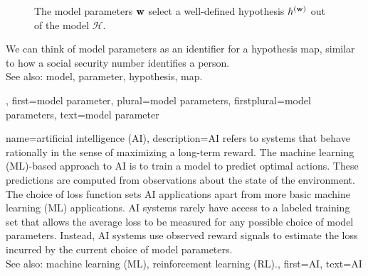 {{{\begin{figure}
		\caption{The model parameters ${\bf w}$ select a well-defined 
		hypothesis $h^{({\bf w})}$ out of the model $\mathcal{H}$.}
	\end{figure}
    We can think of model parameters as an identifier for 
	a hypothesis map, similar to how a social security number 
	identifies a person.\\
		See also: model, parameter, hypothesis, map.},
	first={model parameter},
	plural={model parameters},
	firstplural={model parameters},
	text={model parameter} 
}

{name={artificial intelligence (AI)}, 
	description={AI refers to systems that behave rationally in the sense of 
		maximizing a long-term reward. The machine learning (ML)-based approach to AI is to train a model to  
		predict optimal actions. These predictions are computed from observations about the state of the 
		environment. The choice of loss function sets AI applications apart from more basic machine learning (ML) applications. 
		AI systems rarely have access to a labeled training set that allows the average loss to be 
		measured for any possible choice of model parameters. Instead, AI systems use observed reward 
		signals to estimate the loss incurred by the current choice of model parameters.
				\\
		See also: machine learning (ML), reinforcement learning (RL).},
	first={AI},
	text={AI} 
}


}
